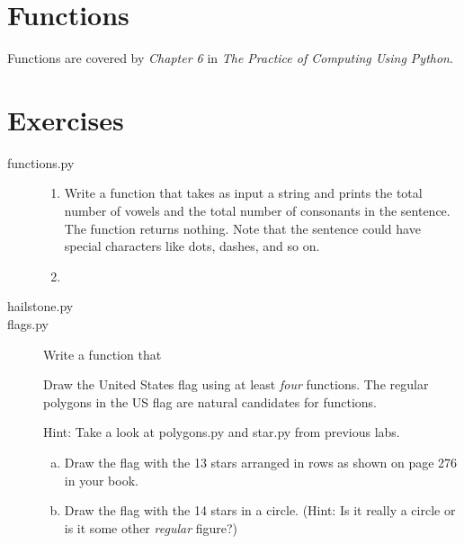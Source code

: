 \documentclass[11pt]{cselabheader}
\begin{document}
\section{Functions}

Functions are covered by \emph{Chapter 6} in \emph{The Practice of Computing
Using Python}.

\section{Exercises}
\label{sec:ex}

\begin{description}
  \item[functions.py] \hfill
    
    \begin{enumerate}
      \item Write a function that takes as input a string and prints the total
        number of vowels and the total number of consonants in the sentence. The
        function returns nothing. Note that the sentence could have special
        characters like dots, dashes, and so on.

      \item 

    \end{enumerate}

  \item[hailstone.py]

  \item[flags.py] 

        Write a function that 
    
    
    Draw the United States flag using at least \emph{four}
    functions. The regular polygons in the US flag are natural candidates for
    functions.
    
    Hint: Take a look at polygons.py and star.py from previous labs.

    \begin{enumerate}[(a)]
      \item Draw the flag with the 13 stars arranged in rows as shown on page
        276 in your book.
      \item Draw the flag with the 14 stars in a circle. (Hint: Is it really a
        circle or is it some other \emph{regular} figure?)
    \end{enumerate}
\end{description} 
\end{document}
